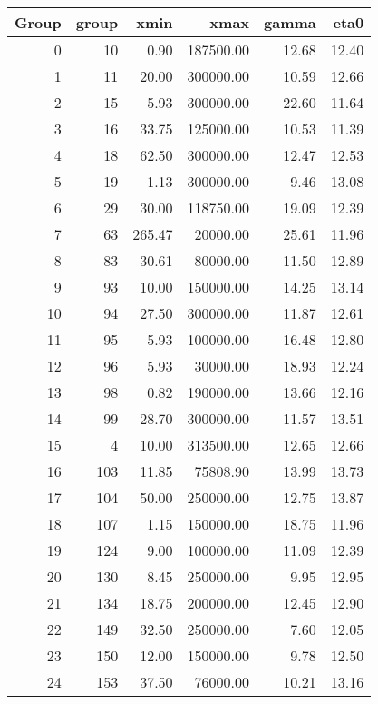 \begin{tabular}{rrrrrr}
\toprule
 Group &  group &   xmin &      xmax &  gamma &  eta0 \\
\midrule
     0 &     10 &   0.90 & 187500.00 &  12.68 & 12.40 \\
     1 &     11 &  20.00 & 300000.00 &  10.59 & 12.66 \\
     2 &     15 &   5.93 & 300000.00 &  22.60 & 11.64 \\
     3 &     16 &  33.75 & 125000.00 &  10.53 & 11.39 \\
     4 &     18 &  62.50 & 300000.00 &  12.47 & 12.53 \\
     5 &     19 &   1.13 & 300000.00 &   9.46 & 13.08 \\
     6 &     29 &  30.00 & 118750.00 &  19.09 & 12.39 \\
     7 &     63 & 265.47 &  20000.00 &  25.61 & 11.96 \\
     8 &     83 &  30.61 &  80000.00 &  11.50 & 12.89 \\
     9 &     93 &  10.00 & 150000.00 &  14.25 & 13.14 \\
    10 &     94 &  27.50 & 300000.00 &  11.87 & 12.61 \\
    11 &     95 &   5.93 & 100000.00 &  16.48 & 12.80 \\
    12 &     96 &   5.93 &  30000.00 &  18.93 & 12.24 \\
    13 &     98 &   0.82 & 190000.00 &  13.66 & 12.16 \\
    14 &     99 &  28.70 & 300000.00 &  11.57 & 13.51 \\
    15 &      4 &  10.00 & 313500.00 &  12.65 & 12.66 \\
    16 &    103 &  11.85 &  75808.90 &  13.99 & 13.73 \\
    17 &    104 &  50.00 & 250000.00 &  12.75 & 13.87 \\
    18 &    107 &   1.15 & 150000.00 &  18.75 & 11.96 \\
    19 &    124 &   9.00 & 100000.00 &  11.09 & 12.39 \\
    20 &    130 &   8.45 & 250000.00 &   9.95 & 12.95 \\
    21 &    134 &  18.75 & 200000.00 &  12.45 & 12.90 \\
    22 &    149 &  32.50 & 250000.00 &   7.60 & 12.05 \\
    23 &    150 &  12.00 & 150000.00 &   9.78 & 12.50 \\
    24 &    153 &  37.50 &  76000.00 &  10.21 & 13.16 \\

\end{tabular}
